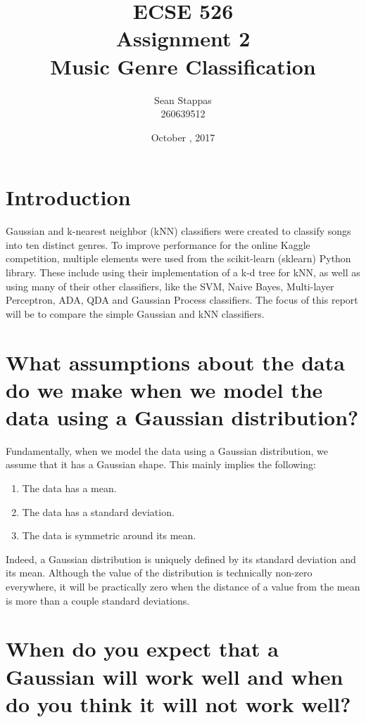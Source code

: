 \documentclass[a4paper,titlepage]{article}
\title{
	\textbf{ECSE 526 \\ Assignment 2}
	\\ \large Music Genre Classification
}
\author{Sean Stappas \\ 260639512}
\date{October \nth{19}, 2017}
\begin{document}
	\sloppy
	\maketitle
	\twocolumn
	
	\section*{Introduction}
	
	Gaussian and k-nearest neighbor (kNN) classifiers were created to classify songs into ten distinct genres. To improve performance for the online Kaggle competition, multiple elements were used from the scikit-learn (sklearn) Python library. These include using their implementation of a k-d tree for kNN, as well as using many of their other classifiers, like the SVM, Naive Bayes, Multi-layer Perceptron, ADA, QDA and Gaussian Process classifiers. The focus of this report will be to compare the simple Gaussian and kNN classifiers.
	
	\section{What assumptions about the data do we make when we model the data using a Gaussian distribution?}
	
	Fundamentally, when we model the data using a Gaussian distribution, we assume that it has a Gaussian shape. This mainly implies the following:
	
	\begin{enumerate}
		\item The data has a mean.
		\item The data has a standard deviation.
		\item The data is symmetric around its mean.
	\end{enumerate}
	
	Indeed, a Gaussian distribution is uniquely defined by its standard deviation and its mean. Although the value of the distribution is technically non-zero everywhere, it will be practically zero when the distance of a value from the mean is more than a couple standard deviations.
	
	\section{When do you expect that a Gaussian will work well and when do you think it will not work well?}
	
\end{document}

